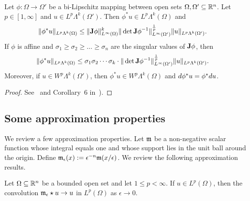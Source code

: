 \documentclass[10pt,a4paper]{article}
\begin{document}
\begin{proposition}\label{proposition:pullbackestimate}
    Let $\phi : \Omega \rightarrow \Omega'$ be a bi-Lipschitz mapping between open sets $\Omega, \Omega' \subseteq {\mathbb R}^{n}$.
    Let $p \in [1,\infty]$ and $u \in L^{p}\Lambda^{k}(\Omega')$. 
    Then $\phi^{\ast} u \in L^{p}\Lambda^{k}(\Omega)$ and 
    \begin{align}
        \| \phi^{\ast} u \|_{L^{p}\Lambda^{k}(\Omega)}
        &\leq 
        \| {\mathbf{J}} \phi \|^{k}_{L^{\infty}(\Omega)}
        \| \det{\mathbf{J}} \phi^{-1} \|^{\frac{1}{p}}_{L^{\infty}(\Omega')}
        \| u \|_{L^{p}\Lambda^{k}(\Omega')}
        .
    \end{align}
    If $\phi$ is affine and $\sigma_1 \geq \sigma_2 \geq \dots \geq \sigma_n$ are the singular values of ${\mathbf{J}}\phi$, then 
    \begin{align}
        \| \phi^{\ast} u \|_{L^{p}\Lambda^{k}(\Omega)}
        &\leq 
        \sigma_1 \sigma_2 \cdots \sigma_k \cdot 
        \| \det{\mathbf{J}} \phi^{-1} \|^{\frac{1}{p}}_{L^{\infty}(\Omega')}
        \| u \|_{L^{p}\Lambda^{k}(\Omega')}
        .
    \end{align}
	Moreover, if $u \in W^{p}\Lambda^{k}(\Omega')$, then $\phi^{\ast} u \in W^{p}\Lambda^{k}(\Omega)$ and $d \phi^{\ast} u = \phi^{\ast} d u$. 
\end{proposition}
\begin{proof}
	See~\cite{licht2019smoothed} and Corollary~6 in~\cite{stern2013lp}).
\end{proof}




\subsection{Some approximation properties}

We review a few approximation properties. 
Let ${\mathfrak m}$ be a non-negative scalar function whose integral equals one and whose support lies in the unit ball around the origin.
Define ${\mathfrak m}_{\epsilon}(x) := \epsilon^{-n} {\mathfrak m}(x/\epsilon)$. We review the following approximation results.

\begin{lemma}
    Let $\Omega \subseteq {\mathbb R}^{n}$ be a bounded open set and let $1 \leq p < \infty$. 
    If $u \in L^{p}(\Omega)$, then the convolution ${\mathfrak m}_{\epsilon} \star u \rightarrow u$ in $L^{p}(\Omega)$ as $\epsilon \rightarrow 0$.
\end{lemma}
\end{document}
